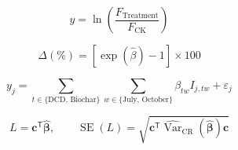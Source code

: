 \begin{equation}
y=\ln\!\left(\frac{F_{\mathrm{Treatment}}}{F_{\mathrm{CK}}}\right)
\end{equation}

\begin{equation}
\Delta(\%)=\left[\exp(\hat{\beta})-1\right]\times100
\end{equation}

\begin{equation}
y_j=\sum_{t\in\{\mathrm{DCD},\,\mathrm{Biochar}\}}
\sum_{w\in\{\mathrm{July},\,\mathrm{October}\}}
\beta_{tw}I_{j,tw}+\varepsilon_j
\end{equation}

\begin{equation}
L=\mathbf{c}^{\mathsf T}\hat{\boldsymbol\beta},\qquad
\operatorname{SE}(L)=
\sqrt{\mathbf{c}^{\mathsf T}\widehat{\operatorname{Var}}_{\mathrm{CR}}
(\hat{\boldsymbol\beta})\mathbf{c}}
\end{equation}
